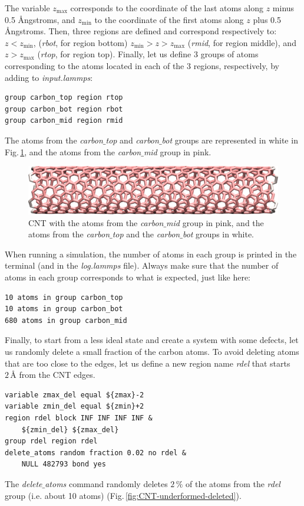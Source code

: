 \documentclass[9pt,tutorial]{livecoms}
\begin{document}
\noindent The variable $z_\mathrm{max}$ corresponds to the coordinate of the last atoms along $z$ minus 0.5 Ångstroms, and $z_\mathrm{min}$ to the coordinate of the first atoms along $z$ plus 0.5 Ångstroms. Then, three regions are defined and correspond respectively to: $z < z_\mathrm{min}$, (\textit{rbot}, for region bottom) $z_\mathrm{min} > z > z_\mathrm{max}$ (\textit{rmid}, for region middle), and $z > z_\mathrm{max}$ (\textit{rtop}, for region top). Finally, let us define 3 groups of atoms corresponding to the atoms located in each of the 3 regions, respectively, by adding to \textit{input.lammps}:
{\normalsize \begin{verbatim}
group carbon_top region rtop
group carbon_bot region rbot
group carbon_mid region rmid
\end{verbatim}}
The atoms from the \textit{carbon$\_$top} and \textit{carbon$\_$bot} groups are represented in white in Fig.\,\ref{fig:CNT-underformed}, and the atoms from the \textit{carbon$\_$mid} group in pink.

\begin{figure}
\centering
\includegraphics[width=\linewidth]{CNT-underformed}
\caption{CNT with the atoms from the \textit{carbon$\_$mid} group in pink, and the atoms from the \textit{carbon$\_$top} and the \textit{carbon$\_$bot} groups in white.}
\label{fig:CNT-underformed}
\end{figure}

When running a simulation, the number of atoms in each group is printed in the terminal (and in the \textit{log.lammps} file). Always make sure that the number of atoms in each group corresponds to what is expected, just like here:
{\normalsize \begin{verbatim}
10 atoms in group carbon_top
10 atoms in group carbon_bot
680 atoms in group carbon_mid
\end{verbatim}}
Finally, to start from a less ideal state and create a system with some defects, 
let us randomly delete a small fraction of the carbon atoms. To avoid deleting atoms that are too close to the edges, let us define a new region name \textit{rdel} that starts $2\,Å$ from the CNT edges.
{\normalsize \begin{verbatim}
variable zmax_del equal ${zmax}-2
variable zmin_del equal ${zmin}+2
region rdel block INF INF INF INF &
    ${zmin_del} ${zmax_del}
group rdel region rdel
delete_atoms random fraction 0.02 no rdel &
    NULL 482793 bond yes
\end{verbatim}}
The \textit{delete$\_$atoms} command randomly deletes $2\,\%$ of the atoms from the \textit{rdel} group (i.e. about 10 atoms) (Fig.\,\ref{fig:CNT-underformed-deleted}).
\end{document}

